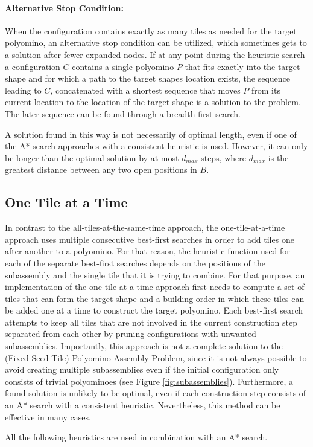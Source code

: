\paragraph{Alternative Stop Condition:}
When the configuration contains exactly as many tiles as needed for the target polyomino, an alternative stop condition can be utilized, which sometimes gets to a solution after fewer expanded nodes.
If at any point during the heuristic search a configuration $C$ contains a single polyomino $P$ that fits exactly into the target shape and for which a path to the target shapes location exists, the sequence leading to $C$, concatenated with a shortest sequence that moves $P$ from its current location to the location of the target shape is a solution to the problem. The later sequence can be found through a breadth-first search. \par
A solution found in this way is not necessarily of optimal length, even if one of the A* search approaches with a consistent heuristic is used. However, it can only be longer than the optimal solution by at most $d_{max}$ steps, where $d_{max}$ is the greatest distance between any two open positions in $B$.


\subsection{One Tile at a Time}

In contrast to the all-tiles-at-the-same-time approach, the one-tile-at-a-time approach uses multiple consecutive best-first searches in order to add tiles one after another to a polyomino. For that reason, the heuristic function used for each of the separate best-first searches depends on the positions of the subassembly and the single tile that it is trying to combine. For that purpose, an implementation of the one-tile-at-a-time approach first needs to compute a set of tiles that can form the target shape and a building order in which these tiles can be added one at a time to construct the target polyomino. Each best-first search attempts to keep all tiles that are not involved in the current construction step separated from each other by pruning configurations with unwanted subassemblies. Importantly, this approach is not a complete solution to the (Fixed Seed Tile) Polyomino Assembly Problem, since it is not always possible to avoid creating multiple subassemblies even if the initial configuration only consists of trivial polyominoes (see Figure \ref{fig:subassemblies}). Furthermore, a found solution is unlikely to be optimal, even if each construction step consists of an A* search with a consistent heuristic. Nevertheless, this method can be effective in many cases. \par
All the following heuristics are used in combination with an A* search.

